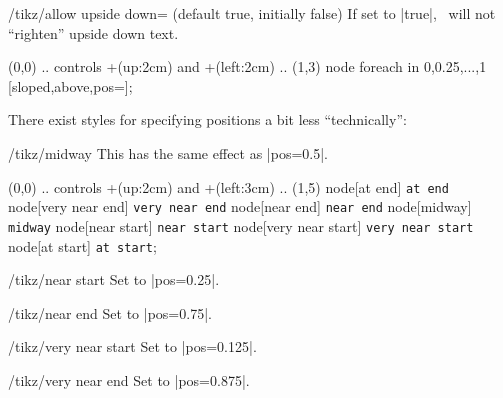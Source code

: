 \begin{key}{/tikz/allow upside down= (default true, initially false)}
    If set to |true|, \tikzname\ will not ``righten'' upside down text.
\begin{codeexample}[]
  \draw (0,0) .. controls +(up:2cm) and +(left:2cm) .. (1,3)
    node foreach \p in {0,0.25,...,1} [sloped,above,pos=\p]{\p};
\end{codeexample}
\begin{codeexample}[]
\end{codeexample}
\end{key}

There exist styles for specifying positions a bit less ``technically'':

\begin{stylekey}{/tikz/midway}
    This has the same effect as |pos=0.5|.
\begin{codeexample}[]
\tikz \draw (0,0) .. controls +(up:2cm) and +(left:3cm) .. (1,5)
       node[at end]          {\texttt{at end}}
       node[very near end]   {\texttt{very near end}}
       node[near end]        {\texttt{near end}}
       node[midway]          {\texttt{midway}}
       node[near start]      {\texttt{near start}}
       node[very near start] {\texttt{very near start}}
       node[at start]        {\texttt{at start}};
\end{codeexample}
\end{stylekey}

\begin{stylekey}{/tikz/near start}
    Set to |pos=0.25|.
\end{stylekey}

\begin{stylekey}{/tikz/near end}
    Set to |pos=0.75|.
\end{stylekey}

\begin{stylekey}{/tikz/very near start}
    Set to |pos=0.125|.
\end{stylekey}

\begin{stylekey}{/tikz/very near end}
    Set to |pos=0.875|.
\end{stylekey}

